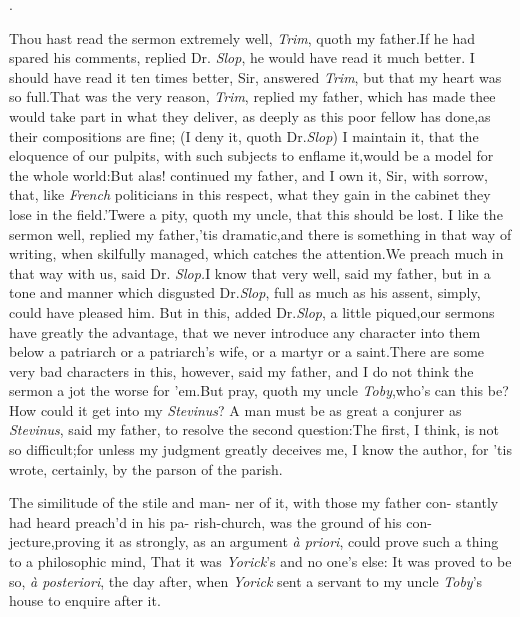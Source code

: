 \documentclass{article}
\begin{document}
\centerline{.}

\bigskip
{}

\newpage
Thou hast read the sermon extremely well, \textit{Trim}, quoth
my father.\tsk If he had spared his comments, replied Dr.\@
\textit{Slop}, he would have read it much better.  I should have
read it ten times better, Sir, answered \textit{Trim}, but that
my heart was so full.\tsk That was the very reason,
\textit{Trim}, replied my father, which has made thee 
would take part in what they deliver, as deeply as
this poor fellow has done,\tsk as their compositions are fine;
(I deny it, quoth Dr.\@ \textit{Slop}) I maintain it,
that the eloquence of our pulpits, with such subjects to enflame
it,\tsk would be a model for the whole world:\tsk But alas!
continued my father, and I own it, Sir, with sorrow, that, like
\textit{French} politicians in this respect, what they gain in
the cabinet they lose in the field.\tsh ’Twere a pity, quoth my
uncle, that this should be lost. I like the sermon well, replied
my father,\tsh ’tis dramatic,\tsk and there is something in
that way of writing, when skilfully managed, which catches the
attention.\tsh We preach much in that way with us, said Dr.\@
\textit{Slop.}\tsk I know that very well, said my father,\tsk
but in a tone and manner which disgusted Dr.\@ \textit{Slop},
full as much as his assent, simply, could have pleased him.\tsh
But in this, added Dr.\@ \textit{Slop}, a little piqued,\tsk our
sermons have greatly the advantage, that we never introduce any
character into them below a patriarch or a patriarch’s wife, or
a martyr or a saint.\tsk There are some very bad characters in
this, however, said my father, and I do not think the sermon a
jot the worse for ’em.\tsh But pray, quoth my uncle
\textit{Toby},\tsk who’s can this 
be?\tsk How could it get into my \textit{Stevinus}? A man must
be as great a conjurer as \textit{Stevinus}, said my father, to
resolve the second question:\tsk The first, I think, is not so
difficult;\tsh for unless my judg\-ment greatly deceives me,\tsh
I know the author, for ’tis wrote, certainly, by the parson of
the parish.

The similitude of the stile and man-\break
ner of it, with those my father con-\break
stantly had heard preach’d in his pa-\break
rish-church, was the ground of his con-\break
jecture,\tsh proving it as strongly, as an argument
\textit{à priori}, could prove such a thing to a philosophic
mind, That it was \textit{Yorick}’s and no one’s
else:\tsh\break 
It was proved to be so, \textit{à posteriori},\break
the day after, when \textit{Yorick} sent a servant to my uncle
\textit{Toby}’s house to enquire\break
after it.\\\newpage
\end{document}
